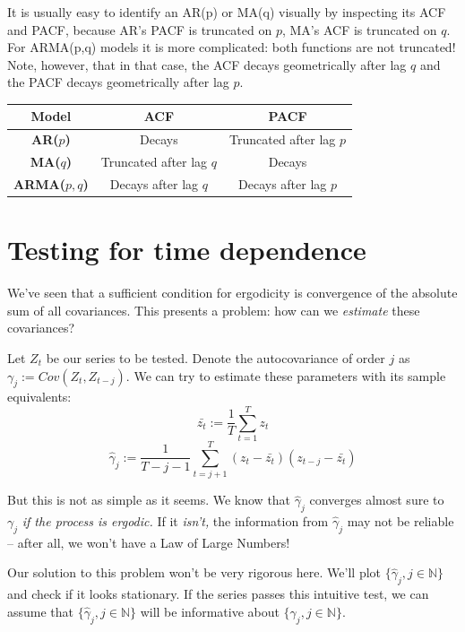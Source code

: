 \documentclass[11pt, a4paper]{report}
\theoremstyle{plain}
\theoremstyle{plain}
\theoremstyle{remark}
\begin{document}
It is usually easy to identify an AR(p) or MA(q) visually by inspecting its ACF and PACF, because AR's PACF is truncated on $p$, MA's ACF is truncated on $q$. For ARMA(p,q) models it is more complicated: both functions are not truncated! Note, however, that in that case, the ACF decays geometrically after lag $q$ and the PACF decays geometrically after lag $p$.

\vspace{1em}

\begin{center}


\begin{tabular}{|c|c|c|}
	\hline
	\textbf{Model}  &\textbf{ ACF }& \textbf{PACF} \\
	\hline
	\textbf{AR($p$)} & Decays & Truncated after lag $p$ \\
	\hline
	\textbf{MA($q$)} & Truncated after lag $q$ & Decays \\
	\hline
	\textbf{ARMA($p,q$)} & Decays after lag $q$ & Decays after lag $p$ \\
	\hline
\end{tabular}


\end{center}

\section{Testing for time dependence} %


We've seen that a sufficient condition for ergodicity is convergence of the absolute sum of all covariances. This presents a problem: how can we \textit{estimate} these covariances?

Let $Z_t$ be our series to be tested. Denote the autocovariance of order $j$ as $\gamma_{j} := Cov(Z_t, Z_{t-j})$. We can try to estimate these parameters with its sample equivalents: 
$$ \bar{z_t} := \dfrac{1}{T} \sum_{t=1}^{T} z_t $$
$$ \hat{\gamma}_{j} := \dfrac{1}{T - j - 1} \sum_{t = j+1}^{T} (z_t - \bar{z_t})(z_{t-j} - \bar{z_t}) $$

But this is not as simple as it seems. We know that $\hat{\gamma}_{j}$ converges almost sure to $\gamma_{j}$ \textit{if the process is ergodic.} If it \textit{isn't,} the information from $\hat{\gamma}_{j}$ may not be reliable -- after all, we won't have a Law of Large Numbers! 

Our solution to this problem won't be very rigorous here. We'll plot $\{\hat{\gamma}_{j}, j \in \mathbb{N}\}$ and check if it looks stationary. If the series passes this intuitive test, we can assume that $\{\hat{\gamma}_{j}, j \in \mathbb{N}\}$ will be informative about $\{{\gamma}_{j}, j \in \mathbb{N}\}$. 
\end{document}
